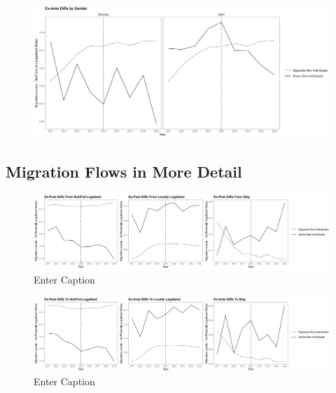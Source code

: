 \documentclass[12pt,letterpaper]{article}
\begin{document}
\centering
\begin{scriptsize}

\end{scriptsize}

\begin{figure}
    \centering
    \includegraphics[width=1\linewidth]{outputs/summary_stats/sex_ante_diffs.png}
    \label{fig:enter-label}
\end{figure}

\centering
\begin{scriptsize}

\end{scriptsize}


\subsection{Migration Flows in More Detail}
\clearpage
\begin{figure}
    \centering
    \includegraphics[width=1\linewidth]{outputs/summary_stats/flows_post_diffs.png}
    \caption{Enter Caption}
    \label{fig:enter-label}
\end{figure}

\begin{figure}
    \centering
    \includegraphics[width=1\linewidth]{outputs/summary_stats/flows_ante_diffs.png}
    \caption{Enter Caption}
    \label{fig:enter-label}
\end{figure}
\end{document}
